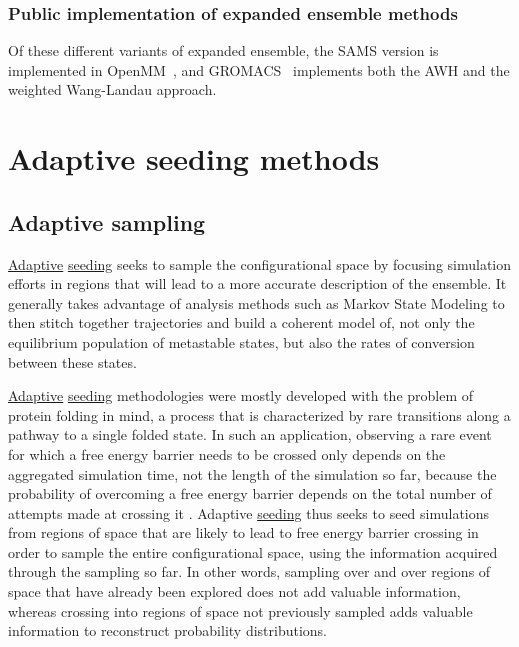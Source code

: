 \documentclass[9pt,review]{livecoms}
\begin{document}
\subsubsection{Public implementation of expanded ensemble methods}

Of these different variants of expanded ensemble, the SAMS version is implemented in OpenMM~\cite{10.1371/journal.pcbi.1005659}, and GROMACS~\cite{lindahl_2021} implements both the AWH and the weighted Wang-Landau approach.

\section{Adaptive seeding methods}
\label{sec:seeding}
\subsection{Adaptive sampling}
\hyperlink{ref:Adaptive} {Adaptive} \hyperlink{ref:Seeding} {seeding} seeks to sample the configurational space by focusing simulation efforts in regions that will lead to a more accurate description of the ensemble. It generally takes advantage of analysis methods such as Markov State Modeling to then stitch together trajectories and build a coherent model of, not only the equilibrium population of metastable states, but also the rates of conversion between these states.

\hyperlink{ref:Adaptive} {Adaptive} \hyperlink{ref:Seeding} {seeding} methodologies were mostly developed with the problem of protein folding in mind, a process that is characterized by rare transitions along a pathway to a single folded state. In such an application, observing a rare event for which a free energy barrier needs to be crossed only depends on the aggregated simulation time, not the length of the simulation so far, because the probability of overcoming a free energy barrier depends on the total number of attempts made at crossing it \cite{PhysRevLett.86.4983,doi:10.1021/acs.jctc.8b00500}. Adaptive \hyperlink{ref:Seeding} {seeding} thus seeks to seed simulations from regions of space that are likely to lead to free energy barrier crossing in order to sample the entire configurational space, using the information acquired through the sampling so far. In other words, sampling over and over regions of space that have already been explored does not add valuable information, whereas crossing into regions of space not previously sampled adds valuable information to reconstruct probability distributions.
\end{document}
